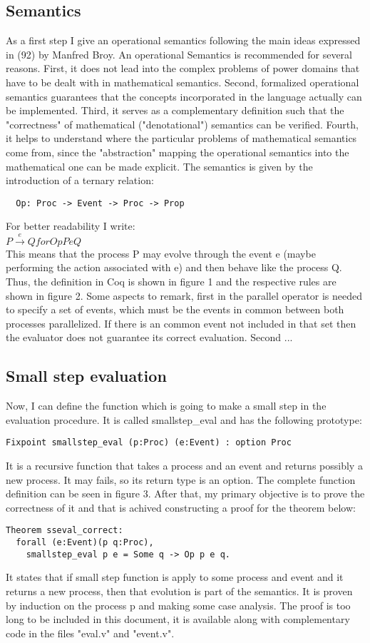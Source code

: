 \documentclass{comjnl}
\begin{document}
\subsection{Semantics}
As a first step I give an operational semantics following the main ideas expressed in (92) by Manfred Broy. An operational Semantics is recommended for several reasons. First, it does not lead into the complex problems of power domains that have to be dealt with in mathematical semantics. Second, formalized operational semantics guarantees that the concepts incorporated in the language actually can be implemented. Third, it serves as a complementary definition such that the "correctness" of mathematical ("denotational") semantics can be verified. Fourth, it helps to understand where the particular problems of mathematical semantics come from, since the "abstraction" mapping the operational semantics into the mathematical one can be made explicit.
The semantics is given by the introduction of a ternary relation:\\
\begin{verbatim}
  Op: Proc -> Event -> Proc -> Prop
\end{verbatim}
For better readability I write:\\
$ P \xrightarrow{e} Q for Op P e Q $\\

This means that the process P may evolve through the event e (maybe performing the action associated with e) and then behave like the process Q.
Thus, the definition in Coq is shown in figure 1 and the respective rules are shown in figure 2.
Some aspects to remark, first in the parallel operator is needed to specify a set of events, which must be the events in common between both processes parallelized. If there is an common event not included in that set then the evaluator does not guarantee its correct evaluation. Second ...
\subsection{Small step evaluation}
Now, I can define the function which is going to make a small step in the evaluation procedure. It is called smallstep\_eval and has the following prototype:
\begin{verbatim}
Fixpoint smallstep_eval (p:Proc) (e:Event) : option Proc
\end{verbatim}
It is a recursive function that takes a process and an event and returns possibly a new process. It may fails, so its return type is an option. The complete function definition can be seen in figure 3. After that, my primary objective is to prove the correctness of it and that is achived constructing a proof for the theorem below:
\begin{verbatim}
Theorem sseval_correct: 
  forall (e:Event)(p q:Proc), 
    smallstep_eval p e = Some q -> Op p e q.
\end{verbatim}
It states that if small step function is apply to some process and event and it returns a new process, then that evolution is part of the semantics. It is proven by induction on the process p and making some case analysis. The proof is too long to be included in this document, it is available along with complementary code in the files "eval.v" and "event.v".
\end{document}
